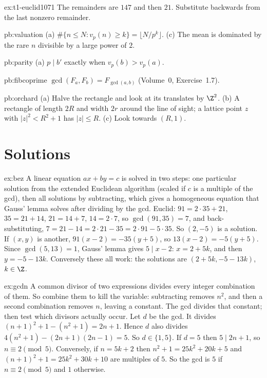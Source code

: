 \begin{hint}{ex:t1-euclid1071}
The remainders are $147$ and then $21$. Substitute backwards from the last nonzero remainder.
\end{hint}

\begin{hint}{pb:valuation}
(a) $\#\{n\le N:v_p(n)\ge k\}=\lfloor N/p^k\rfloor$. (c) The mean is dominated by the rare $n$ divisible by a large power of $2$.
\end{hint}

\begin{hint}{pb:parity}
(a) $p\mid b'$ exactly when $v_p(b)>v_p(a)$.
\end{hint}

\begin{hint}{pb:fibcoprime}
$\gcd(F_a,F_b)=F_{\gcd(a,b)}$ (Volume~0, Exercise~1.7).
\end{hint}

\begin{hint}{pb:orchard}
(a) Halve the rectangle and look at its translates by $\Z^2$. (b) A rectangle of length $2R$ and width $2r$ around the line
of sight; a lattice point $z$ with $|z|^2<R^2+1$ has $|z|\le R$. (c) Look towards $(R,1)$.
\end{hint}

\section{Solutions}

\begin{solution}{ex:bez}
\idea A linear equation $ax+by=c$ is solved in two steps: one particular solution from the extended Euclidean algorithm (scaled if $c$ is a multiple of the gcd), then all solutions by subtracting, which gives a homogeneous equation that Gauss' lemma solves after dividing by the gcd.
\writeup Euclid: $91=2\cdot35+21$, $35=21+14$, $21=14+7$, $14=2\cdot7$, so $\gcd(91,35)=7$, and back-substituting,
$7=21-14=2\cdot21-35=2\cdot91-5\cdot35$. So $(2,-5)$ is a solution. If $(x,y)$ is another, $91(x-2)=-35(y+5)$, so $13(x-2)=-5(y+5)$. Since $\gcd(5,13)=1$, Gauss' lemma gives $5\mid x-2$: $x=2+5k$, and then $y=-5-13k$. Conversely these all work: the solutions are $(2+5k,-5-13k)$, $k\in\Z$.
\end{solution}

\begin{solution}{ex:gcdn}
\idea A common divisor of two expressions divides every integer combination of them. So combine them to kill the variable: subtracting removes $n^2$, and then a second combination removes $n$, leaving a constant. The gcd divides that constant; then test which divisors actually occur.
\writeup Let $d$ be the gcd. It divides $(n+1)^2+1-(n^2+1)=2n+1$. Hence $d$ also divides $4(n^2+1)-(2n+1)(2n-1)=5$. So $d\in\{1,5\}$. If $d=5$ then $5\mid2n+1$, so $n\equiv2\pmod5$. Conversely, if $n=5k+2$ then $n^2+1=25k^2+20k+5$ and $(n+1)^2+1=25k^2+30k+10$ are multiples of $5$. So the gcd is $5$ if $n\equiv2\pmod5$ and $1$ otherwise.
\end{solution}

